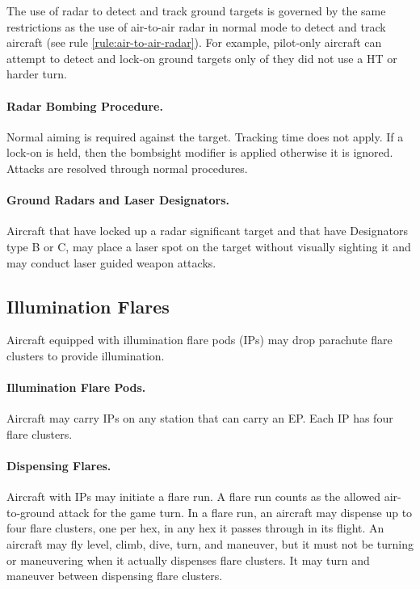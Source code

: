 \begin{advancedrules}
{{The use of radar to detect and track ground targets is governed by the same restrictions as the use of air-to-air radar in normal mode to detect and track aircraft (see rule \ref{rule:air-to-air-radar}). For example, pilot-only aircraft can attempt to detect and lock-on ground targets only of they did not use a HT or harder turn.
}

\paragraph{Radar Bombing Procedure.} Normal aiming is required against the target. Tracking time does not apply. If a lock-on is held, then the bombsight modifier is applied otherwise it is ignored. Attacks are resolved through normal procedures.

\paragraph{Ground Radars and Laser Designators.} Aircraft that have locked up a radar significant target and that have Designators type B or C, may place a laser spot on the target without visually sighting it and may conduct laser guided weapon attacks.


}{

\subsection{Illumination Flares}

Aircraft equipped with illumination flare pods (IPs) may drop parachute flare clusters to provide illumination.

\paragraph{Illumination Flare Pods.} Aircraft may carry IPs on any station that can carry an EP. Each IP has four flare clusters.  

\paragraph{Dispensing Flares.} Aircraft with IPs may initiate a flare run. A flare run counts as the allowed air-to-ground attack for the game turn. In a flare run, an aircraft may dispense up to four flare clusters, one per hex, in any hex it passes through in its flight. An aircraft may fly level, climb, dive, turn, and maneuver, but it must not be turning or maneuvering when it actually dispenses flare clusters. It may turn and maneuver between dispensing flare clusters.

}
\end{advancedrules}
